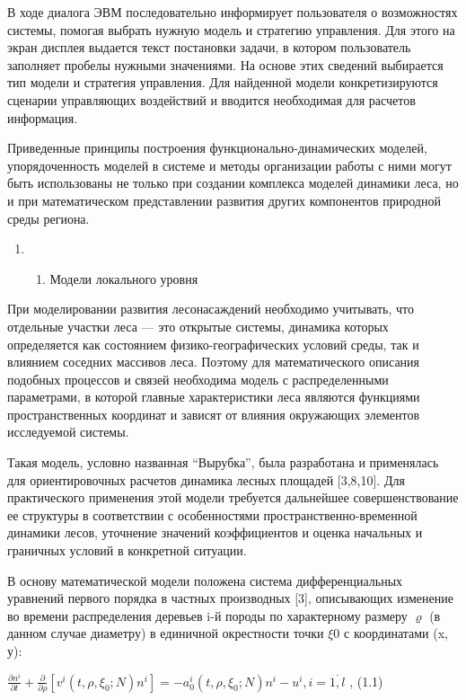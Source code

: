 \documentclass{report}
\begin{document}
В ходе диалога ЭВМ последовательно информирует пользова\-теля о возможностях системы, помогая выбрать нужную модель и
стратегию управления. Для этого на экран дисплея выдается текст постановки задачи, в котором пользователь заполняет
про\-белы нужными значениями. На основе этих сведений выбирается тип модели и стратегия управления. Для найденной
модели кон\-кретизируются сценарии управляющих воздействий и вводится необходимая для расчетов информация. 

Приведенные принципы построения функционально-динами\-ческих моделей, упорядоченность мо\-делей в системе и методы
организации работы с ними могут быть использованы не только при создании комплекса моделей дина\-мики леса, но и при
математическом представлении развития других компонентов природной среды региона.

\begin{enumerate}
\item \begin{enumerate}
\item Модели локального уровня
\end{enumerate}
\end{enumerate}
При моделировании развития лесонасаждений необходимо учитывать, что отдельные участки леса — это открытые системы,
динамика которых определяется как состоянием физико-геогра\-фических условий среды, так и влиянием соседних массивов
леса. Поэтому для математического описания подобных процессов и связей необходима модель с распределенными параметрами,
в которой главные характеристики леса являются функциями про\-странственных координат и зависят от влияния окружающих
эле\-ментов исследуемой системы.

Такая модель, условно названная “Вырубка”, была разрабо\-тана и применялась для ориентировочных расчетов динамика лесных
площадей [3,8,10]. Для практиче\-ского применения этой модели требуется дальнейшее совершенст\-вование ее структуры в
соответствии с особенностями пространственно-временной динамики лесов, уточнение значений коэффици\-ентов и оценка
начальных и граничных условий в конкретной ситуации.

В основу математической модели положена система дифферен\-циальных уравнений первого порядка в частных производных [3],
описывающих изменение во вре\-мени распределения деревьев i{}-й породы по характерному размеру ${\varrho}$ (в данном
случае диаметру) в единичной окрестности точки ${\xi}$0 с координатами (x, у):

 $\frac{\partial n^i}{\partial t}+\frac{\partial }{\partial \rho }\left[v^i\left(t,\rho ,\xi
_0;N\right)n^i\right]=-a_0^i\left(t,\rho ,\xi _0;N\right)n^i-u^i,i=\overline{1,l}$  ,  (1.1)
\end{document}
